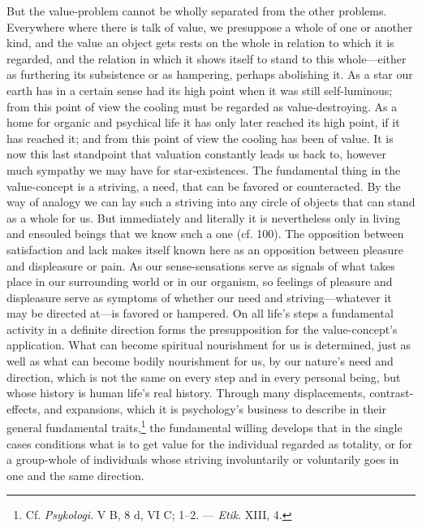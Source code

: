 \documentclass[12pt,a4paper]{book}
\newcommand{\opage}[1]{\marginnote{\footnotesize\textit{[#1]}}}
\begin{document}
But the value-problem cannot be wholly separated from the other problems. Everywhere where there
is talk of value, we presuppose a whole of one or another kind, and the value an object gets rests
on the whole in relation to which it is regarded, and the relation in which it shows itself to
stand to this whole---either as furthering its subsistence or as hampering, perhaps abolishing it.
As a star our earth has in a certain sense had its high point when it was still self-luminous; from
this point of view the cooling must be regarded as value-destroying. As a home for organic and
psychical life it has only later reached its high point, if it has reached it; and from this point
of view the cooling has been of value. It is now this last \opage{347}standpoint that valuation constantly
leads us back to, however much sympathy we may have for star-existences. The fundamental thing in
the value-concept is a striving, a need, that can be favored or counteracted. By the way of analogy
we can lay such a striving into any circle of objects that can stand as a whole for us. But
immediately and literally it is nevertheless only in living and ensouled beings that we know such a
one (cf. 100). The opposition between satisfaction and lack makes itself known here as an opposition
between pleasure and displeasure or pain. As our sense-sensations serve as signals of what takes
place in our surrounding world or in our organism, so feelings of pleasure and displeasure serve as
symptoms of whether our need and striving---whatever it may be directed at---is favored or hampered.
On all life's steps a fundamental activity in a definite direction forms the presupposition for the
value-concept's application. What can become spiritual nourishment for us is determined, just as well
as what can become bodily nourishment for us, by our nature's need and direction, which is not the
same on every step and in every personal being, but whose history is human life's real history.
Through many displacements, contrast-effects, and expansions, which it is psychology's business to
describe in their general fundamental traits,\footnote{Cf. \emph{Psykologi}. V B, 8 d, VI C; 1--2.
--- \emph{Etik}. XIII, 4.} the fundamental willing develops that in the single cases conditions what
is to get value for the individual regarded as totality, or for a group-whole of individuals whose
striving involuntarily or voluntarily goes in one and the same direction.
\end{document}
